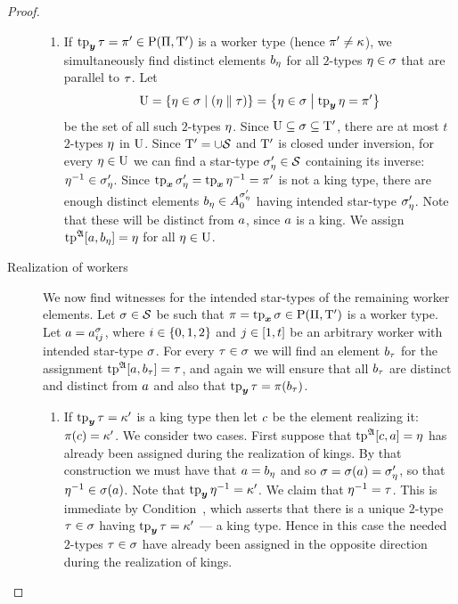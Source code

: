 \begin{proof}
\begin{description}
\begin{enumerate}
  \item If $\operatorname{tp}_{\bm{y}}\tau = {\pi'} \in \mathrm{P}(\Pi,{\mathrm{T}'})$ is a worker type (hence
  ${\pi'} \neq \kappa$), we simultaneously find distinct elements $b_{\eta}$
  for all $2$-types $\eta \in \sigma$ that are parallel to $\tau$.
  Let
  \[
    \mathrm{U} = \left\{\eta \in \sigma\mathrel{}\middle|\mathrel{}(\eta \parallel \tau)\right\} = 
    \left\{\eta\in \sigma\mathrel{}\middle|\mathrel{}\operatorname{tp}_{\bm{y}}\eta = {\pi'}\right\}
  \] be the set of all such $2$-types $\eta$.
  Since $\mathrm{U} \subseteq \sigma \subseteq {\mathrm{T}'}$, there are
  at most $t$ $2$-types $\eta$ in $\mathrm{U}$. Since ${\mathrm{T}'} = \cup\mathcal{S}$ and
  ${\mathrm{T}'}$ is closed under inversion, for every $\eta \in \mathrm{U}$
  we can find a star-type ${\sigma_{\eta}'} \in \mathcal{S}$ containing its inverse:
  $\eta^{-1} \in {\sigma_{\eta}'}$.
  Since $\operatorname{tp}_{\bm{x}}{\sigma_{\eta}'} = \operatorname{tp}_{\bm{x}}\eta^{-1} = {\pi'}$ is not a king type, there
  are enough distinct elements $b_{\eta} \in A^{{\sigma_{\eta}'}}_{0}$ having
  intended star-type ${\sigma_{\eta}'}$. Note that these will be distinct from
  $a$, since $a$ is a king.
  We assign $\operatorname{tp}^{\mathfrak{A}}[a,b_{\eta}] = \eta$ for all $\eta \in \mathrm{U}$.
  \end{enumerate}
  \item[Realization of workers] We now find witnesses for the intended
  star-types of the remaining worker elements.
  Let $\sigma \in \mathcal{S}$ be such that $\pi = \operatorname{tp}_{\bm{x}}\sigma \in \mathrm{P}(\Pi,{\mathrm{T}'})$ is
  a worker type. Let $a = a^{\sigma}_{i j}$, where $i \in \left\{0,1,2\right\}$ and
  $j \in [1,t]$ be an arbitrary worker with intended star-type $\sigma$.
  For every $\tau \in \sigma$ we will find an element $b_\tau$ for the
  assignment $\operatorname{tp}^{\mathfrak{A}}[a,b_\tau] = \tau$, and again we will ensure that
  all $b_{\tau}$ are distinct and distinct from $a$ and also that $\operatorname{tp}_{\bm{y}}\tau
  = \pi(b_{\tau})$.
  \begin{enumerate}
    \item If $\operatorname{tp}_{\bm{y}}\tau = {\kappa'}$ is a king type then let $c$ be the
    element realizing it: $\pi(c) = {\kappa'}$.
    We consider two cases.
    First suppose that $\operatorname{tp}^{\mathfrak{A}}[c,a] = \eta$ has already been assigned
    during the realization of kings.
    By that construction we must have that $a = b_{\eta}$ and so
    $\sigma = \sigma(a) = {\sigma_{\eta}'}$, so that $\eta^{-1} \in
    \sigma(a)$. Note that $\operatorname{tp}_{\bm{y}}\eta^{-1} = {\kappa'}$.
    We claim that $\eta^{-1} = \tau$. This is immediate by
    Condition~, which asserts that there is a unique $2$-type
    $\tau \in \sigma$ having $\operatorname{tp}_{\bm{y}}\tau = {\kappa'}$ --- a king type.
    Hence in this case the needed $2$-types $\tau \in \sigma$ have already been
    assigned in the opposite direction during the realization of kings.
    

\end{enumerate}
\end{description}
\end{proof}
